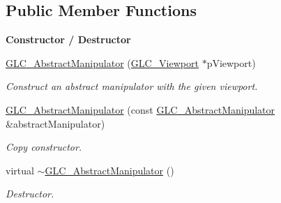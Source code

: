 \subsection*{Public Member Functions}
\begin{Indent}{\bf Constructor / Destructor}\par
\begin{DoxyCompactItemize}
\item 
\hyperlink{class_g_l_c___abstract_manipulator_a82e15091442066c0f5da5e3aacb7afe5}{G\-L\-C\-\_\-\-Abstract\-Manipulator} (\hyperlink{class_g_l_c___viewport}{G\-L\-C\-\_\-\-Viewport} $\ast$p\-Viewport)
\begin{DoxyCompactList}\small\item\em Construct an abstract manipulator with the given viewport. \end{DoxyCompactList}\item 
\hyperlink{class_g_l_c___abstract_manipulator_a8c4bec15dc5857378239e2ffc892a600}{G\-L\-C\-\_\-\-Abstract\-Manipulator} (const \hyperlink{class_g_l_c___abstract_manipulator}{G\-L\-C\-\_\-\-Abstract\-Manipulator} \&abstract\-Manipulator)
\begin{DoxyCompactList}\small\item\em Copy constructor. \end{DoxyCompactList}\item 
virtual \hyperlink{class_g_l_c___abstract_manipulator_aadb74c5ffeffa5873dd240edea5e5ed0}{$\sim$\-G\-L\-C\-\_\-\-Abstract\-Manipulator} ()
\begin{DoxyCompactList}\small\item\em Destructor. \end{DoxyCompactList}\end{DoxyCompactItemize}
\end{Indent}
